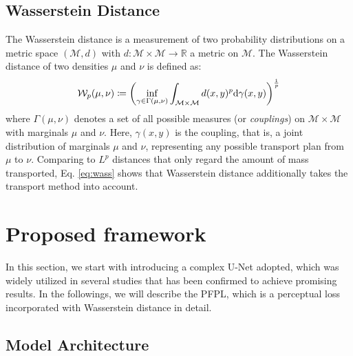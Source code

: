 \documentclass[a4paper]{article}
\begin{document}
\subsection{Wasserstein Distance}
\label{ssec:wasserstein}
The Wasserstein distance \cite{OLKIN1982257} is a measurement of two probability distributions on a metric space $(\mathcal{M}, d)$ with $d:\mathcal{M}\times\mathcal{M}\rightarrow\mathbb{R}$ a metric on $\mathcal{M}$. The Wasserstein distance of two densities $\mu$ and $\nu$ is defined as:
\begin{align}
\label{eq:wass}
    \mathcal{W}_p(\mu,\nu)\coloneqq
    \left(
    \inf_{\gamma\in\Gamma(\mu,\nu)}\int_{\mathcal{M}\times\mathcal{M}}d(x,y)^p{\rm d}\gamma(x,y)
    \right)^\frac{1}{p}
\end{align}
where $\Gamma(\mu, \nu)$ denotes a set of all possible measures (or {\it couplings}) on $\mathcal{M}\times\mathcal{M}$ with marginals $\mu$ and $\nu$. Here, $\gamma(x,y)$ is the coupling, that is, a joint distribution of marginals $\mu$ and $\nu$, representing any possible transport plan from $\mu$ to $\nu$. Comparing to $L^p$ distances that only regard the amount of mass transported, Eq. \eqref{eq:wass} shows that Wasserstein distance additionally takes the transport method into account. 
\section{Proposed framework}
\label{sec:proposedframework}
In this section, we start with introducing a complex U-Net adopted, which was widely utilized in several studies \cite{YaoA19coarse, hu2020dccrn, choi2018phase} that has been confirmed to achieve promising results. In the followings, we will describe the PFPL, which is a perceptual loss incorporated with Wasserstein distance in detail.

\subsection{Model Architecture}
\label{ssec:enhancement_model}
\end{document}
